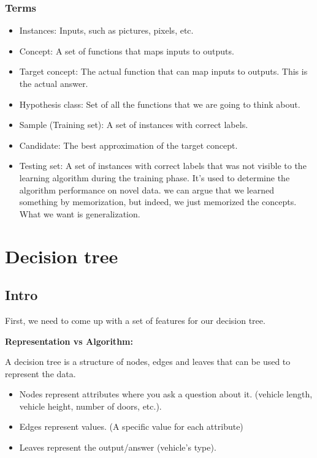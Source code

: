 \documentclass[12pt]{report}
\begin{document}
\subsection{Terms}
\begin{itemize}
\item Instances: Inputs, such as pictures, pixels, etc.
\item Concept: A set of functions that maps inputs to outputs.
\item Target concept: The actual function that can map inputs to outputs. This is the actual answer.
\item Hypothesis class: Set of all the functions that we are going to think about. 
\item Sample (Training set): A set of instances with correct labels.
\item Candidate: The best approximation of the target concept.
\item Testing set: A set of instances with correct labels that was not visible to the learning algorithm during the training phase. It’s used to determine the algorithm performance on novel data. we can argue that we learned something by memorization, but indeed, we just memorized the concepts. What we want is generalization. 
\end{itemize}


\chapter[Decision tree]{Decision tree}

\section{Intro}
\label{sec:dt}

First, we need to come up with a set of features for our decision tree. 


\textbf{Representation vs Algorithm:}

A decision tree is a structure of nodes, edges and leaves that can be used to represent the data.
\begin{itemize}
\item Nodes represent attributes where you ask a question about it. (vehicle length, vehicle height, number of doors, etc.).
\item Edges represent values. (A specific value for each attribute)
\item Leaves represent the output/answer (vehicle’s type).
\end{itemize}
\end{document}
